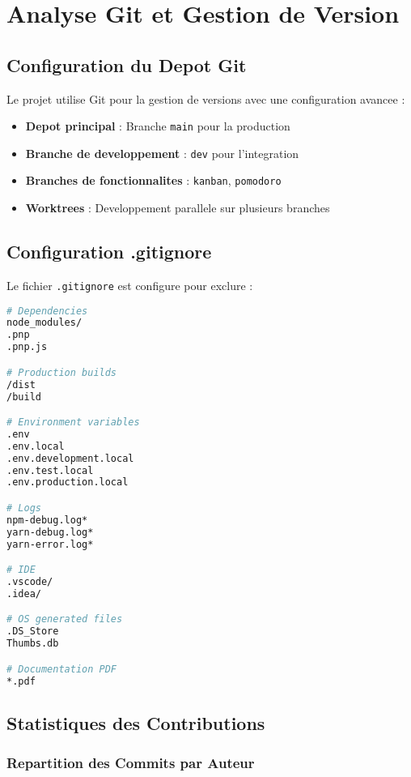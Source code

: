 \documentclass[12pt,a4paper]{article}
\begin{document}
\section{Analyse Git et Gestion de Version}

\subsection{Configuration du Depot Git}

Le projet utilise Git pour la gestion de versions avec une configuration avancee :

\begin{itemize}
    \item \textbf{Depot principal} : Branche \texttt{main} pour la production
    \item \textbf{Branche de developpement} : \texttt{dev} pour l'integration
    \item \textbf{Branches de fonctionnalites} : \texttt{kanban}, \texttt{pomodoro}
    \item \textbf{Worktrees} : Developpement parallele sur plusieurs branches
\end{itemize}

\subsection{Configuration .gitignore}

Le fichier \texttt{.gitignore} est configure pour exclure :

\begin{lstlisting}[language=bash, caption=Configuration .gitignore]
# Dependencies
node_modules/
.pnp
.pnp.js

# Production builds
/dist
/build

# Environment variables
.env
.env.local
.env.development.local
.env.test.local
.env.production.local

# Logs
npm-debug.log*
yarn-debug.log*
yarn-error.log*

# IDE
.vscode/
.idea/

# OS generated files
.DS_Store
Thumbs.db

# Documentation PDF
*.pdf
\end{lstlisting}

\subsection{Statistiques des Contributions}

\subsubsection{Repartition des Commits par Auteur}
\end{document}
